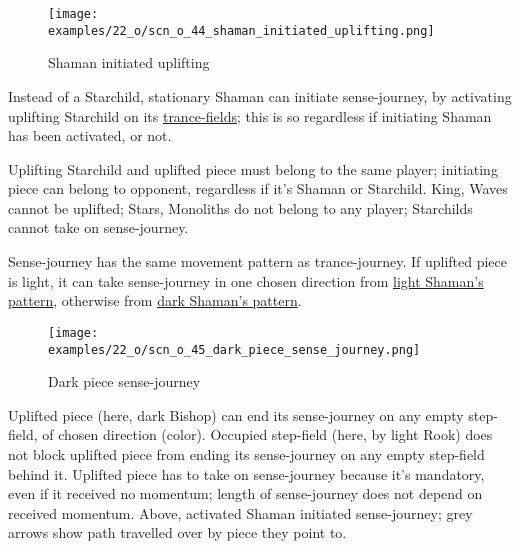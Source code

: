 \vspace*{-0.4\baselineskip}

\noindent
\begin{wrapfigure}[8]{l}{0.4\textwidth}
\centering
\texttt{[image: examples/22\_o/scn\_o\_44\_shaman\_initiated\_uplifting.png]}
\vspace*{-0.4\baselineskip}
\caption{Shaman initiated uplifting}
\label{fig:scn_o_44_shaman_initiated_uplifting}
\end{wrapfigure}
Instead of a Starchild, stationary Shaman can initiate sense-journey, by activating
uplifting Starchild on its \hyperref[fig:scn_cot_40_trance_fields]{trance-fields};
this is so regardless if initiating Shaman has been activated, or not.

Uplifting Starchild and uplifted piece must belong to the same player; initiating
piece can belong to opponent, regardless if it's Shaman or Starchild. King, Waves cannot
be uplifted; Stars, Monoliths do not belong to any player; Starchilds cannot take on
sense-journey.

Sense-journey has the same movement pattern as trance-journey. If uplifted piece
is light, it can take sense-journey in one chosen direction from
\hyperref[fig:scn_cot_52_light_shaman_trance_journey]{light Shaman's pattern},
otherwise from
\hyperref[fig:scn_cot_54_dark_shaman_trance_journey]{dark Shaman's pattern}.

\clearpage %

\vspace*{-2.1\baselineskip}
\noindent
\begin{figure}[!h]
\texttt{[image: examples/22\_o/scn\_o\_45\_dark\_piece\_sense\_journey.png]}
\vspace*{-1.4\baselineskip}
\caption{Dark piece sense-journey}
\label{fig:scn_o_45_dark_piece_sense_journey}
\end{figure}

\vspace*{-0.5\baselineskip}
Uplifted piece (here, dark Bishop) can end its sense-journey on any empty step-field,
of chosen direction (color). Occupied step-field (here, by light Rook) does not block
uplifted piece from ending its sense-journey on any empty step-field behind it.
Uplifted piece has to take on sense-journey because it's mandatory, even if it received
no momentum; length of sense-journey does not depend on received momentum. Above,
activated Shaman initiated sense-journey; grey arrows show path travelled over by
piece they point to.

